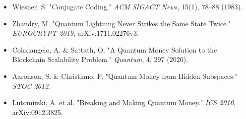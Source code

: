 \documentclass[a4paper,10pt,twoside]{article}
\begin{document}
\begin{itemize}
    \item Wiesner, S. "Conjugate Coding." \textit{ACM SIGACT News}, 15(1), 78–88 (1983).
    \item Zhandry, M. "Quantum Lightning Never Strikes the Same State Twice." \textit{EUROCRYPT 2019}, arXiv:1711.02276v3.
    \item Coladangelo, A. \& Sattath, O. "A Quantum Money Solution to the Blockchain Scalability Problem." \textit{Quantum}, 4, 297 (2020).
    \item Aaronson, S. \& Christiano, P. "Quantum Money from Hidden Subspaces." \textit{STOC 2012}.
    \item Lutomirski, A. et al. "Breaking and Making Quantum Money." \textit{ICS 2010}, arXiv:0912.3825.
\end{itemize}
\end{document}
